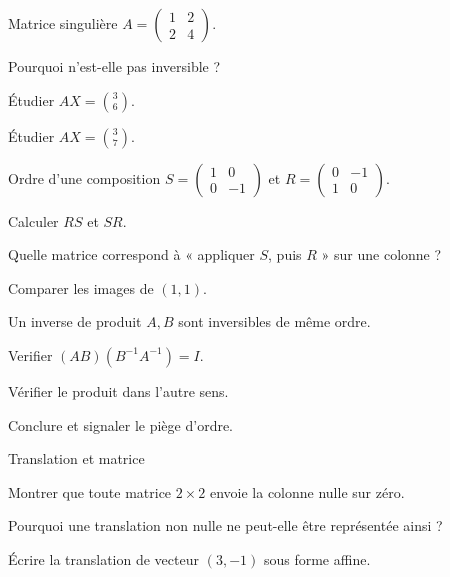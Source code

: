 \clearpage
{}
\begingroup\renewcommand{\otBesoinPlace}[1]{}\begin{minipage}{\linewidth}
\begin{exercice}[3]{Matrice singulière}
$A=\begin{pmatrix}1&2\\2&4\end{pmatrix}$.
\begin{questions}
\item Pourquoi n’est-elle pas inversible ?
\item Étudier $AX=\binom36$.
\item Étudier $AX=\binom37$.
\end{questions}
\end{exercice}
\begin{exercice}[3]{Ordre d’une composition}
$S=\begin{pmatrix}1&0\\0&-1\end{pmatrix}$ et $R=\begin{pmatrix}0&-1\\1&0\end{pmatrix}$.
\begin{questions}
\item Calculer $RS$ et $SR$.
\item Quelle matrice correspond à « appliquer $S$, puis $R$ » sur une colonne ?
\item Comparer les images de $(1,1)$.
\end{questions}
\end{exercice}
\begin{exercice}[3]{Un inverse de produit}
$A,B$ sont inversibles de même ordre.
\begin{questions}
\item Verifier $(AB)(B^{-1}A^{-1})=I$.
\item Vérifier le produit dans l’autre sens.
\item Conclure et signaler le piège d’ordre.
\end{questions}
\end{exercice}
\begin{exercice}[3]{Translation et matrice}

\begin{questions}
\item Montrer que toute matrice $2\times2$ envoie la colonne nulle sur zéro.
\item Pourquoi une translation non nulle ne peut-elle être représentée ainsi ?
\item Écrire la translation de vecteur $(3,-1)$ sous forme affine.
\end{questions}
\end{exercice}
\end{minipage}\endgroup
